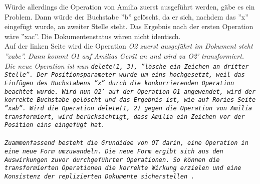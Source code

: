 %
Würde allerdings die Operation von Amilia zuerst ausgeführt werden, gäbe es ein Problem.
Dann würde der Buchstabe ''b'' gelöscht, da er sich, nachdem das ''x'' eingefügt wurde, an zweiter Stelle steht.
Das Ergebnis nach der ersten Operation wäre ''xac''. Die Dokumentenstatus wären nicht identisch.\\
%
Auf der linken Seite wird die Operation \it{O2} zuerst ausgeführt im Dokument steht ''xabc''.
Dann kommt \it{O1} auf Amilias Gerät an und wird zu \it{O2'} transformiert. Die neue Operation ist nun \tt{delete(1, 3)}, ''lösche ein Zeichen an dritter Stelle''. Der Positionsparameter wurde um eins hochgesetzt, weil das Einfügen des Buchstabens ''x'' durch die konkurrierenden Operation beachtet wurde.
Wird nun \it{O2'} auf der Operation \it{O1} angewendet, wird der korrekte Buchstabe gelöscht und das Ergebnis ist, wie auf Rories Seite ''xab''.
Wird die Operation \tt{delete(1, 2)} gegen die Operation von Amilia transformiert, wird berücksichtigt, dass Amilia ein Zeichen vor der Position eins eingefügt hat.\\\\
%
%
Zuammenfassend besteht die Grundidee von \gls{OT} darin, eine Operation in eine neue Form umzuwandeln.
Die neue Form ergibt sich aus den Auswirkungen zuvor durchgeführter Operationen.
So können die transformierten Operationen die korrekte Wirkung erzielen und eine Konsistenz der replizierten Dokumente sicherstellen~\cite{ot-later}.
%
%
